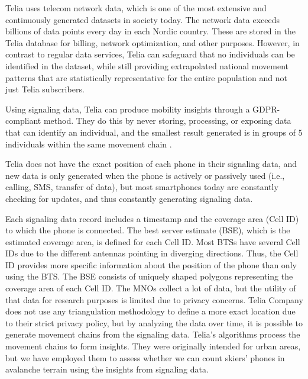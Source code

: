 \documentclass[authordate,empirical, issue]{jote-new-article}
\begin{document}
Telia uses telecom network data, which is one of the most extensive and continuously generated datasets in society today. The network data exceeds billions of data points every day in each Nordic country. These are stored in the Telia database for billing, network optimization, and other purposes. However, in contrast to regular data services, Telia can safeguard that no individuals can be identified in the dataset, while still providing extrapolated national movement patterns that are statistically representative for the entire population and not just Telia subscribers.







Using signaling data, Telia can produce mobility insights through a GDPR-compliant method. They do this by never storing, processing, or exposing data that can identify an individual, and the smallest result generated is in groups of 5 individuals within the same movement chain \parencites{Ågren2021}.







Telia does not have the exact position of each phone in their signaling data, and new data is only generated when the phone is actively or passively used (i.e., calling, SMS, transfer of data), but most smartphones today are constantly checking for updates, and thus constantly generating signaling data.







Each signaling data record includes a timestamp and the coverage area (Cell ID) to which the phone is connected. The best server estimate (BSE), which is the estimated coverage area, is defined for each Cell ID. Most BTSs have several Cell IDs due to the different antennas pointing in diverging directions. Thus, the Cell ID provides more specific information about the position of the phone than only using the BTS. The BSE consists of uniquely shaped polygons representing the coverage area of each Cell ID. The MNOs collect a lot of data, but the utility of that data for research purposes is limited due to privacy concerns. Telia Company does not use any triangulation methodology to define a more exact location due to their strict privacy policy, but by analyzing the data over time, it is possible to generate movement chains from the signaling data. Telia’s algorithms process the movement chains to form insights. They were originally intended for urban areas, but we have employed them to assess whether we can count skiers’ phones in avalanche terrain using the insights from signaling data.
\end{document}
